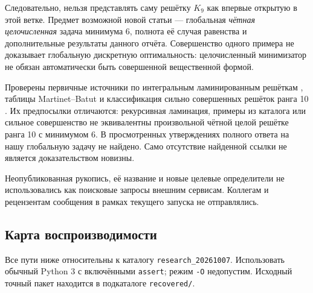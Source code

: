 \documentclass[11pt,a4paper]{article}
\theoremstyle{remark}\newtheorem{remark}[theorem]{Замечание}
\newcommand{\file}[1]{{\small\nolinkurl{#1}}}
\begin{document}
Следовательно, нельзя представлять саму решётку $K_9$ как впервые открытую в этой ветке. Предмет возможной новой статьи --- глобальная \emph{чётная целочисленная} задача минимума 6, полнота её случая равенства и дополнительные результаты данного отчёта. Совершенство одного примера не доказывает глобальную дискретную оптимальность: целочисленный минимизатор не обязан автоматически быть совершенной вещественной формой.

Проверены первичные источники по интегральным ламинированным решёткам \cite{cs,pp}, таблицы Martinet--Batut \cite{martinet} и классификация сильно совершенных решёток ранга 10 \cite{nv}. Их предпосылки отличаются: рекурсивная ламинация, примеры из каталога или сильное совершенство не эквивалентны произвольной чётной целой решётке ранга 10 с минимумом 6. В просмотренных утверждениях полного ответа на нашу глобальную задачу не найдено. Само отсутствие найденной ссылки не является доказательством новизны.

Неопубликованная рукопись, её название и новые целевые определители не использовались как поисковые запросы внешним сервисам. Коллегам и рецензентам сообщения в рамках текущего запуска не отправлялись.

\Needspace{12cm}
\subsection{Карта воспроизводимости}

Все пути ниже относительны к каталогу \file{research_20261007}. Использовать обычный Python 3 с включёнными \texttt{assert}; режим \texttt{-O} недопустим. Исходный точный пакет находится в подкаталоге \file{recovered/}.
\end{document}
